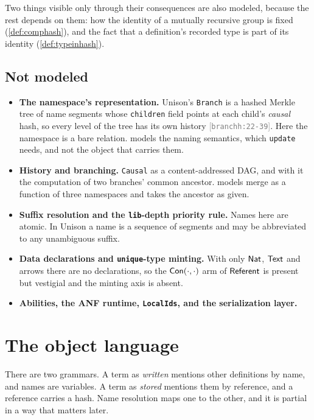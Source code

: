 \documentclass[11pt]{article}
\theoremstyle{definition}
\theoremstyle{plain}
\theoremstyle{remark}
\newcommand{\src}[1]{{\footnotesize\textcolor{gray}{[\texttt{#1}]}}}
\begin{document}
Two things visible only through their consequences are also modeled, because the rest depends on
them: how the identity of a mutually recursive group is fixed (\cref{def:comphash}), and the fact
that a definition's recorded type is part of its identity (\cref{def:typeinhash}).

\subsection{Not modeled}\label{sec:unotmodeled}

\begin{itemize}[nosep]
  \item \textbf{The namespace's representation.} Unison's \texttt{Branch} is a hashed Merkle tree of
        name segments whose \texttt{children} field points at each child's \emph{causal} hash, so
        every level of the tree has its own history \src{branchh:22-39}. Here the namespace is a bare
        relation.  models the naming semantics, which \texttt{update} needs, and
        not the object that carries them.
  \item \textbf{History and branching.} \texttt{Causal} as a content-addressed DAG, and with it the
        computation of two branches' common ancestor.  models merge as a function
        of three namespaces and takes the ancestor as given.
  \item \textbf{Suffix resolution and the \texttt{lib}-depth priority rule.} Names here are atomic.
        In Unison a name is a sequence of segments and may be abbreviated to any unambiguous suffix.
  \item \textbf{Data declarations and \texttt{unique}-type minting.} With only $\mathsf{Nat}$, $\mathsf{Text}$ and
        arrows there are no declarations, so the $\mathsf{Con}(\cdot,\cdot)$ arm of $\mathsf{Referent}$ is present
        but vestigial and the minting axis is absent.
  \item \textbf{Abilities, the ANF runtime, \texttt{LocalIds}, and the serialization layer.}
\end{itemize}

\section{The object language}\label{sec:ulang}

There are two grammars. A term as \emph{written} mentions other definitions by name, and names are
variables. A term as \emph{stored} mentions them by reference, and a reference carries a hash. Name
resolution maps one to the other, and it is partial in a way that matters later.
\end{document}
